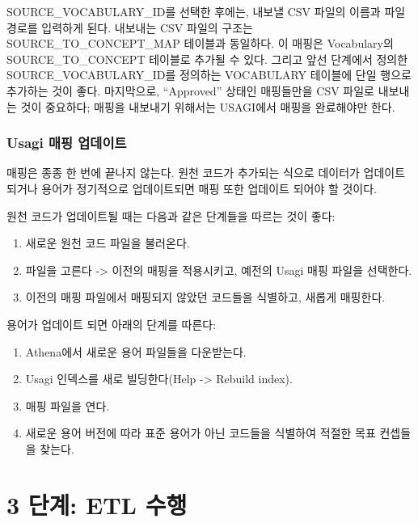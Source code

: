 \documentclass[11pt]{book}
\providecommand{\tightlist}{%
  \setlength{\itemsep}{0pt}\setlength{\parskip}{0pt}}
\theoremstyle{definition}
\theoremstyle{definition}
\theoremstyle{definition}
\theoremstyle{remark}
\begin{document}
SOURCE\_VOCABULARY\_ID를 선택한 후에는, 내보낼 CSV 파일의 이름과 파일
경로를 입력하게 된다. 내보내는 CSV 파일의 구조는
SOURCE\_TO\_CONCEPT\_MAP 테이블과 동일하다. 이 매핑은 Vocabulary의
SOURCE\_TO\_CONCEPT 테이블로 추가될 수 있다. 그리고 앞선 단계에서 정의한
SOURCE\_VOCABULARY\_ID를 정의하는 VOCABULARY 테이블에 단일 행으로
추가하는 것이 좋다. 마지막으로, ``Approved'' 상태인 매핑들만을 CSV
파일로 내보내는 것이 중요하다; 매핑을 내보내기 위해서는 USAGI에서 매핑을
완료해야만 한다.

\subsubsection*{Usagi 매핑 업데이트}\label{usagi--}

매핑은 종종 한 번에 끝나지 않는다. 원천 코드가 추가되는 식으로 데이터가
업데이트 되거나 용어가 정기적으로 업데이트되면 매핑 또한 업데이트 되어야
할 것이다.

원천 코드가 업데이트될 때는 다음과 같은 단계들을 따르는 것이 좋다:

\begin{enumerate}
\def\labelenumi{\arabic{enumi}.}
\tightlist
\item
  새로운 원천 코드 파일을 불러온다.
\item
  파일을 고른다 -\textgreater{} 이전의 매핑을 적용시키고, 예전의 Usagi
  매핑 파일을 선택한다.
\item
  이전의 매핑 파일에서 매핑되지 않았던 코드들을 식별하고, 새롭게
  매핑한다.
\end{enumerate}

용어가 업데이트 되면 아래의 단계를 따른다:

\begin{enumerate}
\def\labelenumi{\arabic{enumi}.}
\tightlist
\item
  Athena에서 새로운 용어 파일들을 다운받는다.
\item
  Usagi 인덱스를 새로 빌딩한다(Help -\textgreater{} Rebuild index).
\item
  매핑 파일을 연다.
\item
  새로운 용어 버전에 따라 표준 용어가 아닌 코드들을 식별하여 적절한 목표
  컨셉들을 찾는다.
\end{enumerate}

\section{3 단계: ETL 수행}\label{-etl-}
\end{document}
